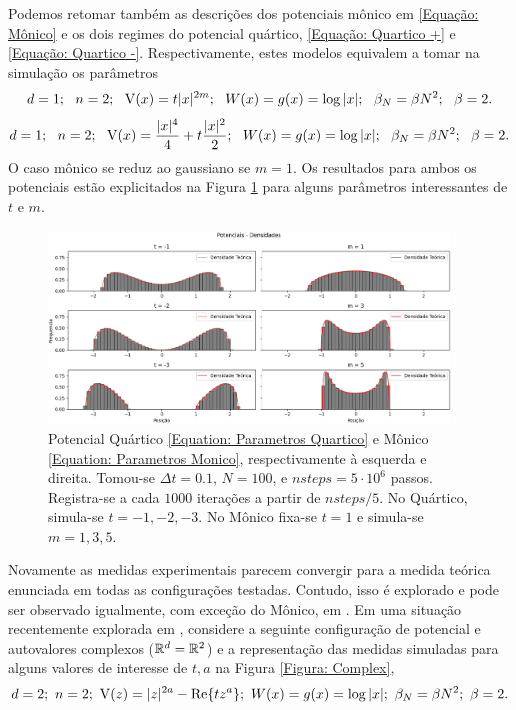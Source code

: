 Podemos retomar também as descrições dos potenciais mônico em \ref{Equação: Mônico} e os dois regimes do potencial quártico, \ref{Equação: Quartico +} e \ref{Equação: Quartico -}. Respectivamente, estes modelos equivalem a tomar na simulação os parâmetros
\begin{equation}
	d = 1; \ \  n = 2; \ \ \operatorname{V}(x)= t |x|^{2m}; \ \ W(x) = g(x) = \log{|x|}; \ \ \beta_N = \beta N^2; \ \ \beta = 2.
	\label{Equation: Parametros Monico}
\end{equation}
\begin{equation}
	d = 1; \ \  n = 2; \ \ \V(x)=\frac{|x|^4}{4} + t \frac{|x|^2}{2}; \ \ W(x) = g(x) = \log{|x|}; \ \ \beta_N = \beta N^2; \ \ \beta = 2.
	\label{Equation: Parametros Quartico}
\end{equation}
O caso mônico se reduz ao gaussiano se $m=1$. Os resultados para ambos os potenciais estão explicitados na Figura \ref{Figura: Quartic Monic} para alguns parâmetros interessantes de $t$ e $m$.
\begin{figure}[ht!]
	\centering
	\includegraphics[width=0.95\textwidth]{Assets/validationQuarticMonic-alt.png}
	\caption{Potencial Quártico \ref{Equation: Parametros Quartico} e Mônico \ref{Equation: Parametros Monico}, respectivamente à esquerda e direita. Tomou-se $\Delta t = 0.1$, $N=100$, e $nsteps = 5\cdot10^6$ passos. Registra-se a cada $1000$ iterações a partir de $nsteps/5$. No Quártico, simula-se $t=-1,-2,-3$. No Mônico fixa-se $t=1$ e simula-se $m=1,3,5$.}
	\label{Figura: Quartic Monic}
\end{figure}

Novamente as medidas experimentais parecem convergir para a medida teórica enunciada em todas as configurações testadas. Contudo, isso é explorado e pode ser observado igualmente, com exceção do Mônico, em \cite{Chafa2018}. Em uma situação recentemente explorada em \cite{balogh2016orthogonal}, considere a seguinte configuração de potencial e autovalores complexos ($\mathbb{R}^d = \mathbb{R}^2$) e a representação das medidas simuladas para alguns valores de interesse de $t, a$ na Figura \ref{Figura: Complex},
\begin{equation}
	d = 2; \  n = 2; \  \operatorname{V}(z)=|z|^{2a} - \Re{t z^a};  \ W(x) = g(x) = \log{|x|};  \ \beta_N = \beta N^2;  \ \beta = 2.
	\label{Equation: Complex}
\end{equation}

